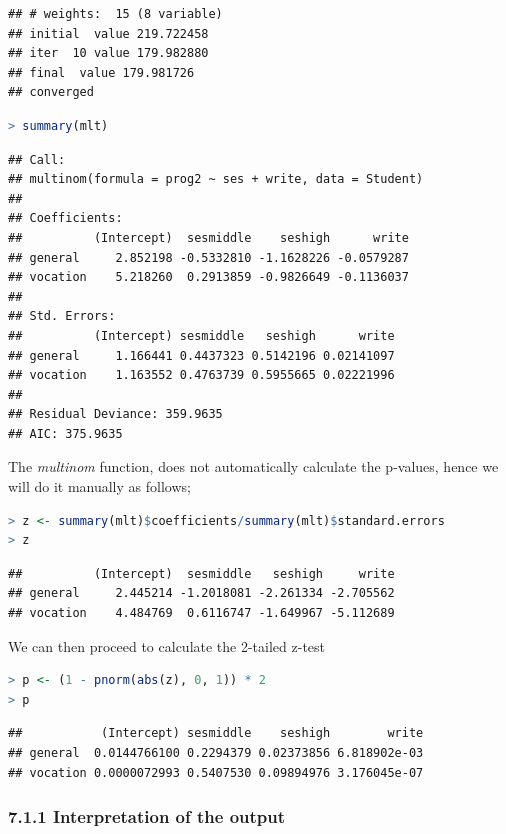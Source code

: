 \documentclass[
]{article}
\begin{document}
\begin{lstlisting}
## # weights:  15 (8 variable)
## initial  value 219.722458 
## iter  10 value 179.982880
## final  value 179.981726 
## converged
\end{lstlisting}

\begin{lstlisting}[language=R]
> summary(mlt)
\end{lstlisting}

\begin{lstlisting}
## Call:
## multinom(formula = prog2 ~ ses + write, data = Student)
## 
## Coefficients:
##          (Intercept)  sesmiddle    seshigh      write
## general     2.852198 -0.5332810 -1.1628226 -0.0579287
## vocation    5.218260  0.2913859 -0.9826649 -0.1136037
## 
## Std. Errors:
##          (Intercept) sesmiddle   seshigh      write
## general     1.166441 0.4437323 0.5142196 0.02141097
## vocation    1.163552 0.4763739 0.5955665 0.02221996
## 
## Residual Deviance: 359.9635 
## AIC: 375.9635
\end{lstlisting}

The \emph{multinom} function, does not automatically calculate the
p-values, hence we will do it manually as follows;

\begin{lstlisting}[language=R]
> z <- summary(mlt)$coefficients/summary(mlt)$standard.errors
> z
\end{lstlisting}

\begin{lstlisting}
##          (Intercept)  sesmiddle   seshigh     write
## general     2.445214 -1.2018081 -2.261334 -2.705562
## vocation    4.484769  0.6116747 -1.649967 -5.112689
\end{lstlisting}

We can then proceed to calculate the 2-tailed z-test

\begin{lstlisting}[language=R]
> p <- (1 - pnorm(abs(z), 0, 1)) * 2
> p
\end{lstlisting}

\begin{lstlisting}
##           (Intercept) sesmiddle    seshigh        write
## general  0.0144766100 0.2294379 0.02373856 6.818902e-03
## vocation 0.0000072993 0.5407530 0.09894976 3.176045e-07
\end{lstlisting}

\hypertarget{interpretation-of-the-output}{%
\subsubsection{7.1.1 Interpretation of the
output}\label{interpretation-of-the-output}}
\end{document}

